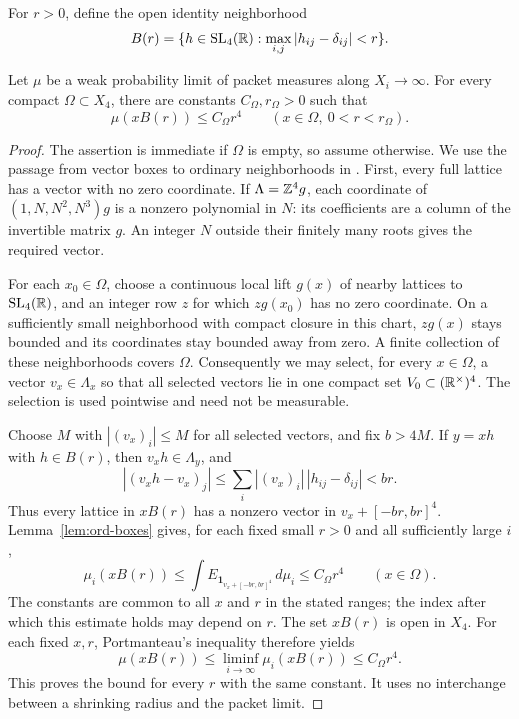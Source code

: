 For \(r>0\), define the open identity neighborhood
\begin{equation}\label{eq:ord-ball-neighborhood}
 B(r)=\{h\in\mathrm{SL}_4(\mathbb R):
              \max_{i,j}|h_{ij}-\delta_{ij}|<r\}.
\end{equation}

\begin{proposition}\label{prop:ord-balls}
Let \(\mu\) be a weak probability limit of packet measures along
\(X_i\to\infty\).  For every compact \(\Omega\subset X_4\), there
are constants \(C_\Omega,r_\Omega>0\) such that
\begin{equation}\label{eq:ord-balls}
 \mu(xB(r))\le C_\Omega r^4
       \qquad(x\in\Omega,\ 0<r<r_\Omega).
\end{equation}
\end{proposition}

\begin{proof}
The assertion is immediate if \(\Omega\) is empty, so assume otherwise.
We use the passage from vector boxes to ordinary neighborhoods in
\cite[Proposition~5.2]{PrimeDegreePackets}.  First, every full lattice
has a vector with no zero coordinate.  If \(\Lambda=\mathbb Z^4g\), each
coordinate of \((1,N,N^2,N^3)g\) is a nonzero polynomial in \(N\):
its coefficients are a column of the invertible matrix \(g\).
An integer \(N\) outside their finitely many roots gives the required
vector.

For each \(x_0\in\Omega\), choose a continuous local lift \(g(x)\) of
nearby lattices to \(\mathrm{SL}_4(\mathbb R)\), and an integer row \(z\)
for which \(zg(x_0)\) has no zero coordinate.  On a sufficiently
small neighborhood with compact closure in this chart, \(zg(x)\)
stays bounded and its coordinates stay bounded away from zero.
A finite collection of these neighborhoods covers \(\Omega\).
Consequently we may select, for every \(x\in\Omega\), a vector
\(v_x\in\Lambda_x\) so that all selected vectors lie in one compact
set \(V_0\subset(\mathbb R^\times)^4\).  The selection is used pointwise and
need not be measurable.

Choose \(M\) with \(|(v_x)_i|\le M\) for all selected vectors, and
fix \(b>4M\).  If \(y=xh\) with \(h\in B(r)\), then
\(v_xh\in\Lambda_y\), and
\[
 |(v_xh-v_x)_j|
 \le \sum_i |(v_x)_i|\,|h_{ij}-\delta_{ij}|<br.
\]
Thus every lattice in \(xB(r)\) has a nonzero vector in
\(v_x+[-br,br]^4\).  Lemma~\ref{lem:ord-boxes} gives, for each fixed
small \(r>0\) and all sufficiently large \(i\),
\[
 \mu_i(xB(r))
 \le \int E_{\mathbf 1_{v_x+[-br,br]^4}}\,d\mu_i
 \le C_\Omega r^4
 \qquad(x\in\Omega).
\]
The constants are common to all \(x\) and \(r\) in the stated ranges;
the index after which this estimate holds may depend on \(r\).
The set \(xB(r)\) is open in \(X_4\).  For each fixed \(x,r\),
Portmanteau's inequality therefore yields
\[
 \mu(xB(r))\le\liminf_{i\to\infty}\mu_i(xB(r))
       \le C_\Omega r^4.
\]
This proves the bound for every \(r\) with the same constant.  It uses
no interchange between a shrinking radius and the packet limit.
\end{proof}
